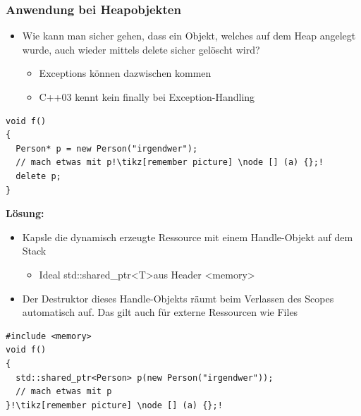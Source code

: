 \subsubsection{Anwendung bei Heapobjekten}
\begin{itemize}[noitemsep,topsep=0pt]
  \item Wie kann man sicher gehen, dass ein Objekt, welches auf dem Heap angelegt wurde, auch wieder mittels delete sicher gelöscht wird?
        \begin{itemize}
          \item Exceptions können dazwischen kommen
          \item C++03 kennt kein finally bei Exception-Handling
        \end{itemize}
\end{itemize}
\begin{lstlisting}[style=C,escapechar=!]
void f()
{
  Person* p = new Person("irgendwer");
  // mach etwas mit p!\tikz[remember picture] \node [] (a) {};!
  delete p;
}
\end{lstlisting}
\textbf{Lösung:}
\begin{itemize}[noitemsep,topsep=0pt]
  \item Kapsle die dynamisch erzeugte Ressource mit einem Handle-Objekt auf dem Stack
        \begin{itemize}[noitemsep,topsep=0pt]
          \item Ideal std::shared\_ptr\textless T\textgreater aus Header \textless memory\textgreater
        \end{itemize}
  \item Der Destruktor dieses Handle-Objekts räumt beim Verlassen des Scopes automatisch auf. Das gilt auch für externe Ressourcen wie Files
\end{itemize}
\begin{lstlisting}[style=C,escapechar=!]
#include <memory>
void f()
{
  std::shared_ptr<Person> p(new Person("irgendwer"));
  // mach etwas mit p
}!\tikz[remember picture] \node [] (a) {};!
\end{lstlisting}

